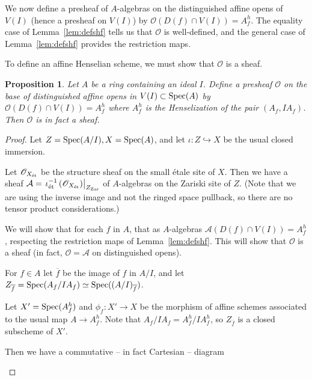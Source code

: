 \documentclass[12pt]{article}
\renewcommand{\O}{\mathscr{O}}
\newcommand{\spec}{{\rm Spec}}
\newcommand{\ol}[1]{\overline{#1}}
\newcommand{\mc}[1]{\mathcal{#1}}
\newcommand{\Et}{\'etale\xspace}
\newcommand{\et}{{\rm\acute{e}t}}
\newcommand{\zar}{{\rm Zar}}
\newtheorem{proposition}[theorem]{Proposition}
\theoremstyle{definition}
\numberwithin{equation}{subsection}
\begin{document}
We now define a presheaf of $A$-algebras on the distinguished affine opens of $V(I)$ (hence a presheaf on $V(I)$) by $\O(D(f) \cap V(I))=A_f^h$. The equality case of Lemma~\ref{lem:defshf} tells us that $\O$ is well-defined, and the general case of Lemma~\ref{lem:defshf} provides the restriction maps.

To define an affine Henselian scheme, we must show that $\O$ is a sheaf. 

\begin{proposition}\label{prop:isshf} Let $A$ be a ring containing an ideal $I$. Define a presheaf $\O$ on the base of distinguished affine opens in $V(I) \subset \spec(A)$ by $\O(D(f) \cap V(I)) =A_f^h$ where $A_f^h$ is the Henselization of the pair $(A_f,IA_f)$. Then $\O$ is in fact a sheaf.
\end{proposition}
\begin{proof} Let $Z=\spec(A/I),X=\spec(A)$, and let $\iota: Z \hookrightarrow X$ be the usual closed immersion.

Let $\O_{X_{\et}}$ be the structure sheaf on the small \Et site of $X$. Then we have a sheaf $\mc{A}=\left.\iota_{\et}^{-1}\left(\O_{X_{\et}}\right)\right|_{Z_{\zar}}$ of $A$-algebras on the Zariski site of $Z$. (Note that we are using the inverse image and not the ringed space pullback, so there are no tensor product considerations.) 

We will show that for each $f$ in $A$, that as $A$-algebras $\mc{A}(D(f) \cap V(I)) =A_f^h$, respecting the restriction maps of Lemma~\ref{lem:defshf}. This will show that $\O$ is a sheaf (in fact, $\O=\mc{A}$ on distinguished opens).

For $f \in A$ let $\ol{f}$ be the image of $f$ in $A/I$, and let $Z_{\ol{f}}=\spec(A_f/IA_f) \simeq \spec((A/I)_{\ol{f}})$. 

Let $X'=\spec(A_f^h)$ and $\phi_f: X' \to X$ be the morphism of affine schemes associated to the usual map $A \to A_f^h$. Note that $A_f/IA_f = A_f^h/IA_f^h$, so $Z_{\ol{f}}$ is a closed subscheme of $X'$. 

Then we have a commutative -- in fact Cartesian -- diagram

\begin{center}
\end{center} \vspace{-.25in}


\end{proof}
\end{document}
